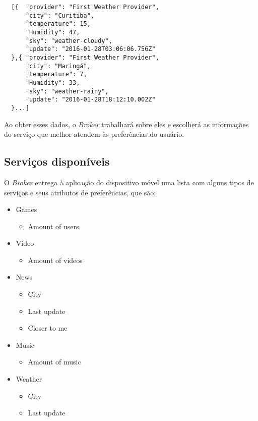 \begin{verbatim}
  [{  "provider": "First Weather Provider",
      "city": "Curitiba",
      "temperature": 15,
      "Humidity": 47,
      "sky": "weather-cloudy",
      "update": "2016-01-28T03:06:06.756Z"
  },{ "provider": "First Weather Provider",
      "city": "Maringá",
      "temperature": 7,
      "Humidity": 33,
      "sky": "weather-rainy",
      "update": "2016-01-28T18:12:10.002Z"
  }...]
\end{verbatim}

Ao obter esses dados, o \textit{Broker} trabalhará sobre eles e escolherá as informações do serviço que melhor atendem às preferências do usuário.

\subsection{Serviços disponíveis}
O \textit{Broker} entrega à aplicação do dispositivo móvel uma lista com alguns tipos de serviços e seus atributos de preferências, que são:

\begin{itemize}
  \item Games
    \begin{itemize}
      \item Amount of users
    \end{itemize}
  \item Video
    \begin{itemize}
      \item Amount of videos
    \end{itemize}
  \item News
    \begin{itemize}
      \item City
      \item Last update
      \item Closer to me
    \end{itemize}
  \item Music
    \begin{itemize}
      \item Amount of music
    \end{itemize}
  \item Weather
    \begin{itemize}
      \item City
      \item Last update
    \end{itemize}
\end{itemize}

